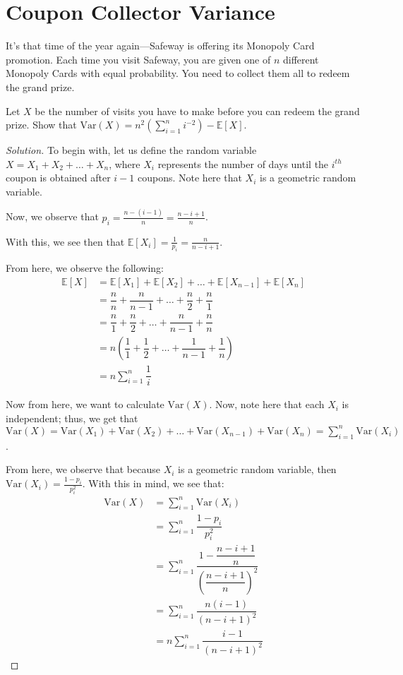 \documentclass{article}
\newenvironment{solution}{\begin{proof}[Solution]}{\end{proof}}
\newcommand{\E}{\mathbb{E}}
\newcommand{\Var}{\mathrm{Var}}
\let\oldsum\sum
\renewcommand{\sum}[2]{\oldsum\limits_{#1}^{#2}}
\begin{document}
\section{Coupon Collector Variance}
It's that time of the year again---Safeway is offering its Monopoly Card promotion. Each time you visit Safeway, you are given one of $n$ different Monopoly Cards with equal probability. You need to collect them all to redeem the grand prize.

\begin{hw}
	Let $X$ be the number of visits you have to make before you can redeem the grand prize. Show that $\Var(X) = n^2\left(\sum{i=1}{n} i^{-2}\right) - \E[X]$.
\end{hw}
\begin{solution}
	To begin with, let us define the random variable $X = X_{1} + X_{2} + \ldots + X_{n}$, where $X_{i}$ represents the number of days until the $i^{th}$ coupon is obtained after $i-1$ coupons. Note here that $X_{i}$ is a geometric random variable.
	
	Now, we observe that $p_{i} = \frac{n-(i-1)}{n} = \frac{n-i+1}{n}$.
	
	With this, we see then that $\E[X_{i}] = \frac{1}{p_{i}} = \frac{n}{n-i+1}$.
	
	From here, we observe the following:
	\begin{align*}
		\E[X] &= \E[X_{1}] + \E[X_{2}] + \ldots + \E[X_{n-1}] + \E[X_{n}] \\
		&= \dfrac{n}{n} + \dfrac{n}{n-1} + \ldots + \dfrac{n}{2} + \dfrac{n}{1} \\
		&= \dfrac{n}{1} + \dfrac{n}{2} + \ldots + \dfrac{n}{n-1} + \dfrac{n}{n} \\
		&= n\left( \dfrac{1}{1} + \dfrac{1}{2} + \ldots + \dfrac{1}{n-1} + \dfrac{1}{n}\right) \\
		&= n \sum{i=1}{n} \dfrac{1}{i}
	\end{align*}

	Now from here, we want to calculate $\Var(X)$. Now, note here that each $X_{i}$ is independent; thus, we get that $\Var(X) = \Var(X_{1}) + \Var(X_{2}) + \ldots + \Var(X_{n-1}) + \Var(X_{n}) = \sum{i=1}{n} \Var(X_{i})$.
	
	From here, we observe that because $X_{i}$ is a geometric random variable, then $\Var(X_{i}) = \frac{1-p_{i}}{p_{i}^{2}}$. With this in mind, we see that:
	\begin{align*}
		\Var(X) &= \sum{i=1}{n} \Var(X_{i}) \\
		&= \sum{i=1}{n} \dfrac{1-p_{i}}{p_{i}^{2}} \\
		&= \sum{i=1}{n} \dfrac{1-\dfrac{n-i+1}{n}}{\left( \dfrac{n-i+1}{n} \right)^{2}} \\
		&= \sum{i=1}{n} \dfrac{n(i-1)}{(n-i+1)^{2}} \\
		&= n\sum{i=1}{n} \dfrac{i-1}{(n-i+1)^{2}}
	\end{align*}


\end{solution}
\end{document}
